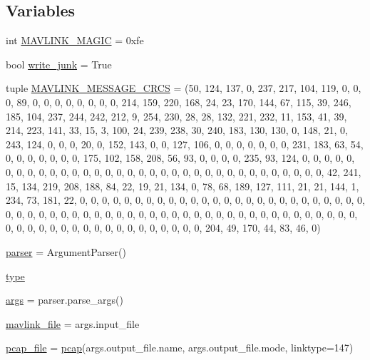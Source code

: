 \subsection*{Variables}
\begin{DoxyCompactItemize}
\item 
int \mbox{\hyperlink{namespacepymavlink_1_1examples_1_1mav2pcap_a8b3b32da57abcd36df64b3bcf167b59b}{M\+A\+V\+L\+I\+N\+K\+\_\+\+M\+A\+G\+IC}} = 0xfe
\item 
bool \mbox{\hyperlink{namespacepymavlink_1_1examples_1_1mav2pcap_a282a364e273b18682a5a5da5fb645b89}{write\+\_\+junk}} = True
\item 
tuple \mbox{\hyperlink{namespacepymavlink_1_1examples_1_1mav2pcap_a00b1acff0f0238af5006772353146ff9}{M\+A\+V\+L\+I\+N\+K\+\_\+\+M\+E\+S\+S\+A\+G\+E\+\_\+\+C\+R\+CS}} = (50, 124, 137, 0, 237, 217, 104, 119, 0, 0, 0, 89, 0, 0, 0, 0, 0, 0, 0, 0, 214, 159, 220, 168, 24, 23, 170, 144, 67, 115, 39, 246, 185, 104, 237, 244, 242, 212, 9, 254, 230, 28, 28, 132, 221, 232, 11, 153, 41, 39, 214, 223, 141, 33, 15, 3, 100, 24, 239, 238, 30, 240, 183, 130, 130, 0, 148, 21, 0, 243, 124, 0, 0, 0, 20, 0, 152, 143, 0, 0, 127, 106, 0, 0, 0, 0, 0, 0, 0, 231, 183, 63, 54, 0, 0, 0, 0, 0, 0, 0, 175, 102, 158, 208, 56, 93, 0, 0, 0, 0, 235, 93, 124, 0, 0, 0, 0, 0, 0, 0, 0, 0, 0, 0, 0, 0, 0, 0, 0, 0, 0, 0, 0, 0, 0, 0, 0, 0, 0, 0, 0, 0, 0, 0, 0, 0, 0, 42, 241, 15, 134, 219, 208, 188, 84, 22, 19, 21, 134, 0, 78, 68, 189, 127, 111, 21, 21, 144, 1, 234, 73, 181, 22, 0, 0, 0, 0, 0, 0, 0, 0, 0, 0, 0, 0, 0, 0, 0, 0, 0, 0, 0, 0, 0, 0, 0, 0, 0, 0, 0, 0, 0, 0, 0, 0, 0, 0, 0, 0, 0, 0, 0, 0, 0, 0, 0, 0, 0, 0, 0, 0, 0, 0, 0, 0, 0, 0, 0, 0, 0, 0, 0, 0, 0, 0, 0, 0, 0, 0, 0, 0, 0, 0, 0, 0, 0, 0, 0, 0, 204, 49, 170, 44, 83, 46, 0)
\item 
\mbox{\hyperlink{namespacepymavlink_1_1examples_1_1mav2pcap_a8de36bcbd07923f42fa0e68e76ac2d59}{parser}} = Argument\+Parser()
\item 
\mbox{\hyperlink{namespacepymavlink_1_1examples_1_1mav2pcap_a4dcd0e188fafa9a646770bdce8970759}{type}}
\item 
\mbox{\hyperlink{namespacepymavlink_1_1examples_1_1mav2pcap_a4f3f0a2bfb0e63569e7be7a951c72324}{args}} = parser.\+parse\+\_\+args()
\item 
\mbox{\hyperlink{namespacepymavlink_1_1examples_1_1mav2pcap_acc0844001cebabe078ad5c9285760550}{mavlink\+\_\+file}} = args.\+input\+\_\+file
\item 
\mbox{\hyperlink{namespacepymavlink_1_1examples_1_1mav2pcap_a78f8cdb50a3b8c40542c9fe3cbd57327}{pcap\+\_\+file}} = \mbox{\hyperlink{classpymavlink_1_1examples_1_1mav2pcap_1_1pcap}{pcap}}(args.\+output\+\_\+file.\+name, args.\+output\+\_\+file.\+mode, linktype=147)
\end{DoxyCompactItemize}


